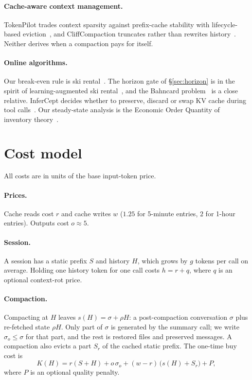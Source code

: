 \documentclass[11pt]{article}
\begin{document}
\paragraph{Cache-aware context management.} TokenPilot trades context sparsity against prefix-cache stability with lifecycle-based eviction~\cite{tokenpilot}, and CliffCompaction truncates rather than rewrites history~\cite{cliff}. Neither derives when a compaction pays for itself.

\paragraph{Online algorithms.} Our break-even rule is ski rental~\cite{karlin88,karlin94}. The horizon gate of \S\ref{sec:horizon} is in the spirit of learning-augmented ski rental~\cite{purohit18}, and the Bahncard problem~\cite{fleischer} is a close relative. InferCept decides whether to preserve, discard or swap KV cache during tool calls~\cite{infercept}. Our steady-state analysis is the Economic Order Quantity of inventory theory~\cite{harris}.

\section{Cost model}\label{sec:model}
All costs are in units of the base input-token price.

\paragraph{Prices.} Cache reads cost $r$ and cache writes $w$ ($1.25$ for 5-minute entries, $2$ for 1-hour entries). Outputs cost $o\approx5$.

\paragraph{Session.} A session has a static prefix $S$ and history $H$, which grows by $g$ tokens per call on average. Holding one history token for one call costs $h=r+q$, where $q$ is an optional context-rot price.

\paragraph{Compaction.} Compacting at $H$ leaves $s(H)=\sigma+\rho H$: a post-compaction conversation $\sigma$ plus re-fetched state $\rho H$. Only part of $\sigma$ is generated by the summary call; we write $\sigma_o\le\sigma$ for that part, and the rest is restored files and preserved messages. A compaction also evicts a part $S_r$ of the cached static prefix. The one-time buy cost is
\begin{equation}
K(H)=r(S+H)+o\,\sigma_o+(w-r)\,\bigl(s(H)+S_r\bigr)+P,
\end{equation}
where $P$ is an optional quality penalty.
\end{document}
